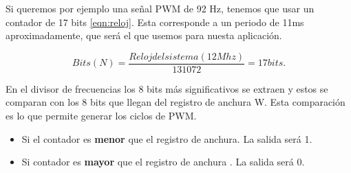 Si queremos por ejemplo una señal PWM de 92 Hz, tenemos que usar un contador de 17 bits \ref{eqn:reloj}. Esta corresponde a un periodo de 11ms aproximadamente, que será el que usemos para nuesta aplicación.

\begin{equation}
Bits(N)= \frac{Reloj del sistema(12Mhz)} {131072}=17 bits.
\label{eqn:reloj}
\end{equation}

En el divisor de frecuencias los 8 bits más significativos se extraen y estos se comparan con los 8 bits que llegan del registro de anchura W. Esta comparación es lo que permite generar los ciclos de PWM.

	\begin{itemize}
	\item Si el contador es \textbf{menor} que el registro de anchura. La salida será 1.
	\item Si contador es \textbf{mayor} que el registro de anchura . La salida será 0.
	\end{itemize}